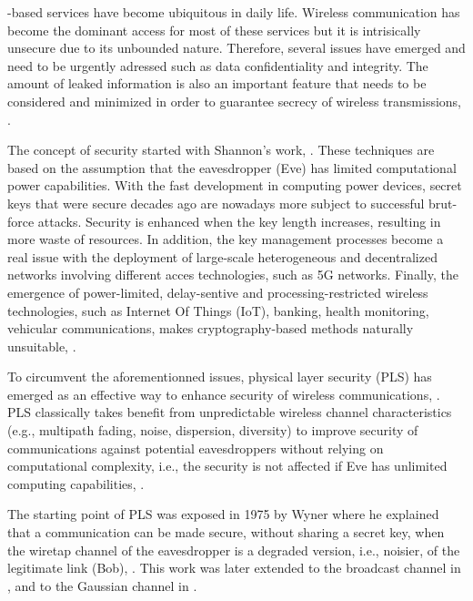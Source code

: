 \documentclass[journal,comsoc]{IEEEtran}
\begin{document}
-based services have become ubiquitous in daily life. Wireless communication has become the dominant access for most of these services but it is intrisically unsecure due to its unbounded nature. Therefore, several issues have emerged and need to be urgently adressed such as data confidentiality and integrity. The amount of leaked information is also an important feature that needs to be considered and minimized in order to guarantee secrecy of wireless transmissions, \cite{8509094,8543573,BlochMatthieu1981-2011Ps:f}.

The concept of security started with Shannon's work, \cite{6769090}. These techniques are based on the assumption that the eavesdropper (Eve) has limited computational power capabilities. With the fast development in computing power devices, secret keys that were secure decades ago are nowadays more subject to successful brut-force attacks. Security is enhanced when the key length increases, resulting in more waste of resources. In addition, the key management processes become a real issue with the deployment of large-scale heterogeneous and decentralized networks involving different acces technologies, such as 5G networks. Finally, the emergence of power-limited, delay-sentive and processing-restricted wireless technologies, such as Internet Of Things (IoT), banking, health monitoring, vehicular communications, makes cryptography-based methods naturally unsuitable, \cite{8509094}.

To circumvent the aforementionned issues, physical layer security (PLS) has emerged as an effective way to enhance security of wireless communications, \cite{alves2012performance,yang2012physical,tran2015secrecy,8353879}. PLS classically takes benefit from unpredictable wireless channel characteristics (e.g., multipath fading, noise, dispersion, diversity) to improve security of communications against potential eavesdroppers without relying on computational complexity, i.e., the security is not affected if Eve has unlimited computing capabilities, \cite{9049811,snchez2020survey}. 

The starting point of PLS was exposed in 1975 by Wyner where he explained that a communication can be made secure, without sharing a secret key, when the wiretap channel of the eavesdropper is a degraded version, i.e., noisier, of the legitimate link (Bob), \cite{6772207}. This work was later extended to the broadcast channel in \cite{1055892}, and to the Gaussian channel in \cite{1055917}. 
\end{document}
